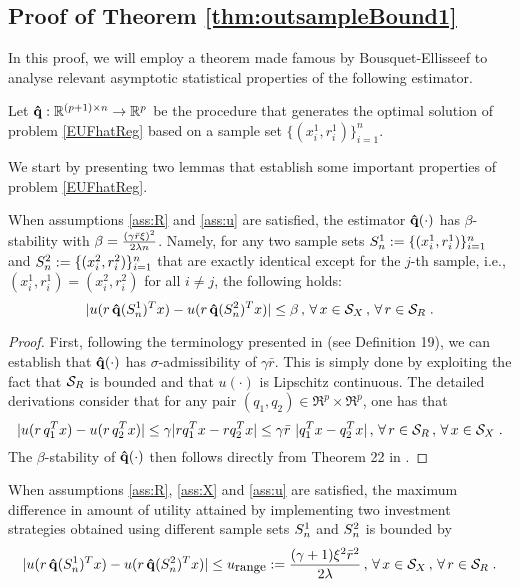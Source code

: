 \subsection{Proof of Theorem \ref{thm:outsampleBound1}}

In this proof, we will employ a theorem made famous by Bousquet-Ellisseef to analyse
relevant asymptotic statistical properties of the following estimator.
\begin{definition}
  Let ${\bold{{\hat{q}}}}:\mathbb{R}^{(p+1)\times n}\rightarrow \mathbb{R}^p$ be the procedure that generates the
  optimal solution of problem \eqref{EUFhatReg} based on a sample set
  $\{(x_i^1,r_i^1)\}_{i=1}^n$.
\end{definition}

We start by presenting two lemmas that establish some important properties of problem
\eqref{EUFhatReg}.
\begin{lemma}\label{beta-bound}
  When assumptions \ref{ass:R} and \ref{ass:u} are satisfied, the estimator
  $\bold{{\hat{q}}}(\cdot)$ has $\beta$-stability with
  $ \beta = \frac{(\gamma\bar r\xi)^2}{2\lambda n}$. Namely, for any two sample sets
  $S_n^1:=\{(x_i^1,r_i^1)\}_{i=1}^n$ and $S_n^2:=\{(x_i^2,r_i^2)\}_{i=1}^n$ that are
  exactly identical except for the $j$-th sample, i.e., $(x_i^1,r_i^1)=(x_i^2,r_i^2)$ for
  all $i\neq j$, the following holds:
  \[
    |u(r\,{\bold{{\hat{q}}}}(S_n^1)^T x) - u(r\,{\bold{{\hat{q}}}}(S_n^2)^T x)| \leq \beta\,,\,\forall\,x\in{\mathcal{S}_X}\,,\,\forall\,r\in{\mathcal{S}_R}\;.
  \]
\end{lemma}

\begin{proof}
  First, following the terminology presented in \cite{bousquet2002stability} (see
  Definition 19), we can establish that ${\bold{{\hat{q}}}}(\cdot)$ has $\sigma$-admissibility of
  $\gamma\bar{r}$. This is simply done by exploiting the fact that ${\mathcal{S}_R}$ is bounded and
  that $u(\cdot)$ is Lipschitz continuous. The detailed derivations consider that for any
  pair $(q_1,q_2)\in\Re^p\times\Re^p$, one has that
  \[ 
    |u(r\,q_1^T x) - u(r\,q_2^T x)| \leq \gamma |rq_1^Tx - rq_2^Tx|\leq \gamma\bar{r}\
    |q_1^Tx - q_2^Tx| \,,\,\forall\,r\in{\mathcal{S}_R}\,,\,\forall\,x\in{\mathcal{S}_X}\;.
  \]
  The $\beta$-stability of $\bold{{\hat{q}}}(\cdot)$ then follows directly from Theorem 22 in
  \cite{bousquet2002stability}.
\end{proof}

\begin{lemma}\label{u-bound}
  When assumptions \ref{ass:R}, \ref{ass:X} and \ref{ass:u} are satisfied, the maximum
  difference in amount of utility attained by implementing two investment strategies
  obtained using different sample sets $S_n^1$ and $S_n^2$ is bounded by
  \[
    |u(r\,\qhatOp(\Sn^1)^T x)-u(r\,\qhatOp(\Sn^2)^T x)| \leq \urange :=
    \frac{(\gamma+1)\xi^2
      \bar{r}^2}{2\lambda}\,,\,\forall\,x\in\Sx\,,\,\forall\,r\in\Sr\;.
  \]
\end{lemma}

